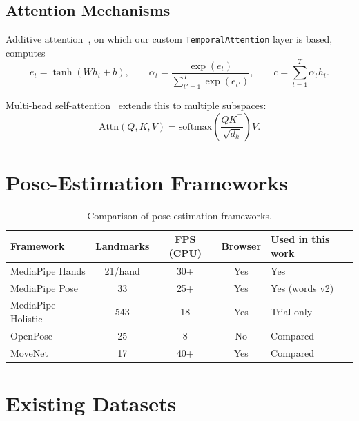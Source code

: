 \subsection{Attention Mechanisms}
\label{sec:lit:attention}

Additive attention~\cite{bahdanau2015neural}, on which our custom
\texttt{TemporalAttention} layer is based, computes
\begin{equation}
  e_t = \tanh(W h_t + b),\qquad
  \alpha_t = \frac{\exp(e_t)}{\sum_{t'=1}^{T} \exp(e_{t'})},\qquad
  c = \sum_{t=1}^{T} \alpha_t h_t.
\end{equation}

Multi-head self-attention~\cite{vaswani2017attention} extends this to
multiple subspaces:
\begin{equation}
  \mathrm{Attn}(Q,K,V) = \mathrm{softmax}\!\left(\frac{Q K^\top}{\sqrt{d_k}}\right) V .
\end{equation}

\section{Pose-Estimation Frameworks}
\label{sec:lit:pose}

\begin{table}[H]\centering
  \caption{Comparison of pose-estimation frameworks.}\label{tab:pose}
  \begin{tabularx}{\textwidth}{l c c c X}\toprule
    Framework & Landmarks & FPS (CPU) & Browser & Used in this work \\\midrule
    MediaPipe Hands   & 21/hand & 30+ & Yes  & Yes \\
    MediaPipe Pose    & 33      & 25+ & Yes  & Yes (words v2) \\
    MediaPipe Holistic & 543    & 18  & Yes  & Trial only \\
    OpenPose          & 25      & 8   & No   & Compared \\
    MoveNet           & 17      & 40+ & Yes  & Compared \\\bottomrule
  \end{tabularx}
\end{table}

\section{Existing Datasets}
\label{sec:lit:datasets}

